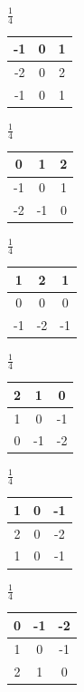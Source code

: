 \documentclass[final,a4paper,openany,12pt]{mwbk}
\begin{document}
\begin{center}
	$\frac{1}{4}$
	\begin{tabular}{|c|c|c|}
		\hline
		-1 & 0 & 1\\
		\hline
		-2 & 0 & 2\\
		\hline
		-1 & 0 & 1\\
		\hline
	\end{tabular}
\end{center}

\begin{center}
	$\frac{1}{4}$
	\begin{tabular}{|c|c|c|}
		\hline
		0 & 1 & 2\\
		\hline
		-1 & 0 & 1\\
		\hline
		-2 & -1 & 0\\
		\hline
	\end{tabular}
\end{center}

\begin{center}
	$\frac{1}{4}$
	\begin{tabular}{|c|c|c|}
		\hline
		1 & 2 & 1\\
		\hline
		0 & 0 & 0\\
		\hline
		-1 & -2 & -1\\
		\hline
	\end{tabular}
\end{center}

\begin{center}
	$\frac{1}{4}$
	\begin{tabular}{|c|c|c|}
		\hline
		2 & 1 & 0\\
		\hline
		1 & 0 & -1\\
		\hline
		0 & -1 & -2\\
		\hline
	\end{tabular}
\end{center}

\begin{center}
	$\frac{1}{4}$
	\begin{tabular}{|c|c|c|}
		\hline
		1 & 0 & -1\\
		\hline
		2 & 0 & -2\\
		\hline
		1 & 0 & -1\\
		\hline
	\end{tabular}
\end{center}

\begin{center}
	$\frac{1}{4}$
	\begin{tabular}{|c|c|c|}
		\hline
		0 & -1 & -2\\
		\hline
		1 & 0 & -1\\
		\hline
		2 & 1 & 0\\
		\hline
	\end{tabular}
\end{center}
\end{document}
